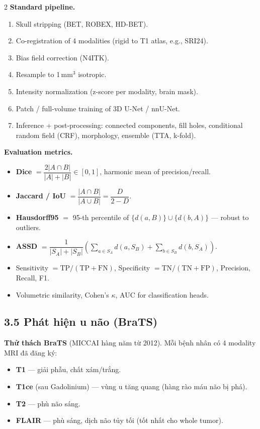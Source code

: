 \begin{paracol}{2}
\textbf{Standard pipeline.}
\begin{enumerate}[leftmargin=*,nosep]
  \item Skull stripping (BET, ROBEX, HD-BET).
  \item Co-registration of 4 modalities (rigid to T1 atlas, e.g., SRI24).
  \item Bias field correction (N4ITK).
  \item Resample to 1\,mm$^3$ isotropic.
  \item Intensity normalization (z-score per modality, brain mask).
  \item Patch / full-volume training of 3D U-Net / nnU-Net.
  \item Inference + post-processing: connected components, fill holes, conditional random field (CRF), morphology, ensemble (TTA, k-fold).
\end{enumerate}

\textbf{Evaluation metrics.}
\begin{itemize}[leftmargin=*,nosep]
  \item \textbf{Dice} $=\dfrac{2|A\cap B|}{|A|+|B|}\in[0,1]$, harmonic mean of precision/recall.
  \item \textbf{Jaccard / IoU} $=\dfrac{|A\cap B|}{|A\cup B|}=\dfrac{D}{2-D}$.
  \item \textbf{Hausdorff95} $=$ 95-th percentile of $\{d(a,B)\}\cup\{d(b,A)\}$ — robust to outliers.
  \item \textbf{ASSD} $=\dfrac{1}{|S_A|+|S_B|}\!\!\left(\!\sum_{a\in S_A}\!d(a,S_B)\!+\!\!\sum_{b\in S_B}\!d(b,S_A)\!\right)$.
  \item Sensitivity $=\mathrm{TP/(TP+FN)}$, Specificity $=\mathrm{TN/(TN+FP)}$, Precision, Recall, F1.
  \item Volumetric similarity, Cohen's $\kappa$, AUC for classification heads.
\end{itemize}

\switchcolumn

\subsection*{3.5 Phát hiện u não (BraTS)}
\textbf{Thử thách BraTS} (MICCAI hàng năm từ 2012). Mỗi bệnh nhân có 4 modality MRI đã đăng ký:
\begin{itemize}[leftmargin=*,nosep]
  \item \textbf{T1} — giải phẫu, chất xám/trắng.
  \item \textbf{T1ce} (sau Gadolinium) — vùng u tăng quang (hàng rào máu não bị phá).
  \item \textbf{T2} — phù não sáng.
  \item \textbf{FLAIR} — phù sáng, dịch não tủy tối (tốt nhất cho whole tumor).
\end{itemize}


\end{paracol}
